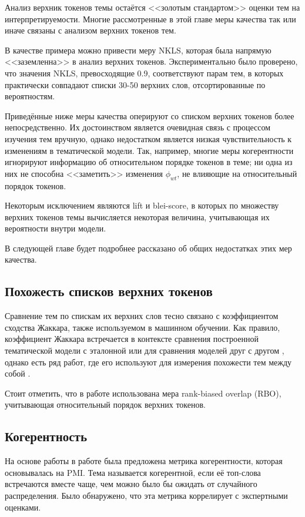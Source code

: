 Анализ верхник токенов темы остаётся <<золотым стандартом>> оценки тем на интерпретируемости. Многие рассмотренные в этой главе меры качества так или иначе связаны с анализом верхних токенов тем.

В качестве примера можно привести меру NKLS, которая была напрямую <<заземленна>> в анализ верхних токенов. Экспериментально было проверено, что значения NKLS, превосходящие 0.9, соответствуют парам тем, в которых практически совпадают списки 30-50 верхних слов, отсортированные по вероятностям.

Приведённые ниже меры качества оперируют со списком верхних токенов более непосредственно. Их достоинством является очевидная связь с процессом изучения тем вручную, однако недостатком является низкая чувствительность к изменениям в тематической модели. Так, например, многие меры когерентности игнорируют информацию об относительном порядке токенов в теме; ни одна из них не способна <<заметить>> изменения $\phi_{wt}$, не влияющие на относительный порядок токенов. 

Некоторым исключением являются lift и blei-score, в которых по множеству верхних токенов темы вычисляется некоторая величина, учитывающая их вероятности внутри модели.

В следующей главе будет подробнее рассказано об общих недостатках этих мер качества.

\subsection{Похожесть списков верхних токенов}
Сравнение тем по спискам их верхних слов тесно связано с коэффициентом сходства Жаккара, также используемом в машинном обучении. Как правило, коэффициент Жаккара встречается в контексте сравнения построенной тематической модели с эталонной \cite{greene14howmany} или для сравнения моделей друг с другом \cite{mantyla2018measuring}, однако есть ряд работ, где его используют для измерения похожести тем между собой \cite{bulatov}\cite{yanginferring}.

Стоит отметить, что в работе \cite{mantyla2018measuring} использована мера rank-biased overlap (RBO), учитывающая относительный порядок верхних токенов.

\subsection{Когерентность}
На основе работы \cite{rtl} в работе \cite{newman2010automatic} была предложена метрика когерентности, которая основывалась на PMI. Тема называется когерентной, если её топ-слова встречаются вместе чаще, чем можно было бы ожидать от случайного распределения. Было обнаружено, что эта метрика коррелирует с экспертными оценками.

